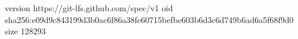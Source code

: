 version https://git-lfs.github.com/spec/v1
oid sha256:e09d9c843199d3b0ac6f86a38fe60715befbe603b6d3c6d749b6ad6a5f68f9d0
size 128293
